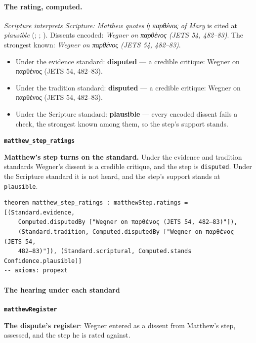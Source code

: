 \documentclass[11pt]{article}
\begin{document}
\paragraph{The rating, computed.} \emph{Scripture interprets Scripture: Matthew quotes ἡ παρθένος of Mary} is cited at \emph{plausible} (\cite[I.ix]{westminster-confession-1647}; \cite[III.21.3]{irenaeus-against-heresies-180}; \cite[483]{wegner-virgin-births-2011}). Dissents encoded: \emph{Wegner on παρθένος (JETS 54, 482–83)}. The strongest known: \emph{Wegner on παρθένος (JETS 54, 482–83)}.
\begin{itemize}
\item Under the evidence standard: \textbf{disputed} --- a credible critique: Wegner on παρθένος (JETS 54, 482–83).
\item Under the tradition standard: \textbf{disputed} --- a credible critique: Wegner on παρθένος (JETS 54, 482–83).
\item Under the Scripture standard: \textbf{plausible} --- every encoded dissent fails a check, the strongest known among them, so the step’s support stands.
\end{itemize}
\par\medskip\noindent\textbf{\texttt{matthew\_\allowbreak{}step\_\allowbreak{}ratings}}\par\nobreak\noindent
\textbf{Matthew’s step turns on the standard.} Under the evidence and tradition standards Wegner’s dissent is a credible critique, and the step is \texttt{disputed}. Under the Scripture standard it is not heard, and the step’s support stands at \texttt{plausible}.

{\small\begin{verbatim}
theorem matthew_step_ratings : matthewStep.ratings = [(Standard.evidence,
    Computed.disputedBy ["Wegner on παρθένος (JETS 54, 482–83)"]),
    (Standard.tradition, Computed.disputedBy ["Wegner on παρθένος (JETS 54,
    482–83)"]), (Standard.scriptural, Computed.stands Confidence.plausible)]
-- axioms: propext
\end{verbatim}}
\paragraph*{The hearing under each standard}
\leavevmode\par\nobreak
\par\medskip\noindent\textbf{\texttt{matthew\allowbreak{}Register}}\par\nobreak\noindent
\textbf{The dispute’s register}: Wegner entered as a dissent from Matthew’s step, assessed, and the step he is rated against.
\end{document}
